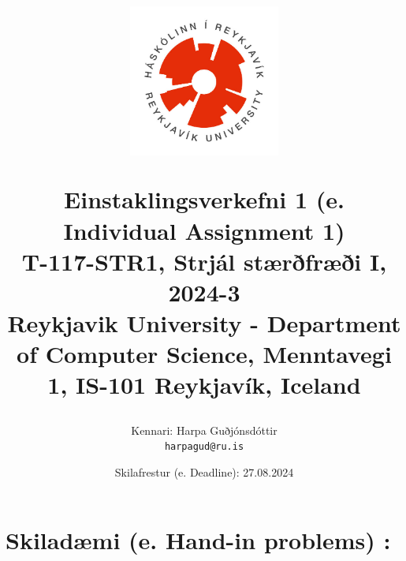 \documentclass[12pt]{article}
\title{
\centerline{\includegraphics[width=50mm]{images/ru_logo.jpg}}
\vspace{0.5 cm}
Einstaklingsverkefni 1 (e. Individual Assignment 1)
\large  \\
T-117-STR1, Strjál stærðfræði I, 2024-3 \\ 
\small Reykjavik University - Department of Computer Science, Menntavegi 1, IS-101 Reykjavík, Iceland 
  }
\author{
    Kennari: Harpa Guðjónsdóttir\\
    \texttt{harpagud@ru.is}
}
\date{Skilafrestur (e. Deadline): 27.08.2024}
\begin{document}
\maketitle

\section*{\textbf{Skiladæmi (e. Hand-in problems) :}}




\end{document}
